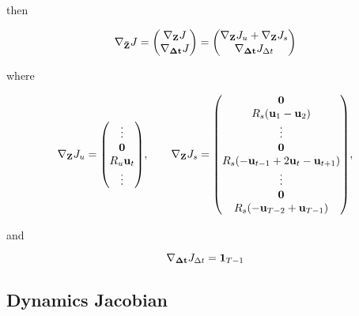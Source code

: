 \documentclass{article}
\begin{document}
then

\begin{equation}
  \nabla_{\vb{\bar Z}} J = \mqty(
    \nabla_{\vb{Z}} J \\
    \nabla_{\vb{\Delta \vb{t}}} J
  ) = \mqty(
    \nabla_{\vb{Z}} J_u + \nabla_{\vb{Z}} J_s \\
    \nabla_{\vb{\Delta \vb{t}}} J_{\Delta t}
  )
\end{equation}

where 

\begin{equation}
  \nabla_{\vb{Z}} J_u = \mqty(
    \vdots \\ 
    \vb{0} \\
    R_u \vb{u}_t \\  
    \vdots \\ 
  ), 
  \quad \quad
  \nabla_{\vb{Z}} J_s = 
  \mqty(
    \vb{0} \\
    R_s \qty(\vb{u}_1 - \vb{u}_2) \\  
    \vdots \\ 
    \vb{0} \\
    R_s \qty(-\vb{u}_{t-1} + 2\vb{u}_t - \vb{u}_{t+1}) \\
    \vdots \\
    \vb{0} \\
    R_s \qty(-\vb{u}_{T-2} + \vb{u}_{T-1})
  ),
\end{equation}

and

\begin{equation}
  \nabla_{\vb{\Delta \vb{t}}} J_{\Delta t} = \vb{1}_{T-1}
\end{equation}





\subsection{Dynamics Jacobian}
\end{document}
